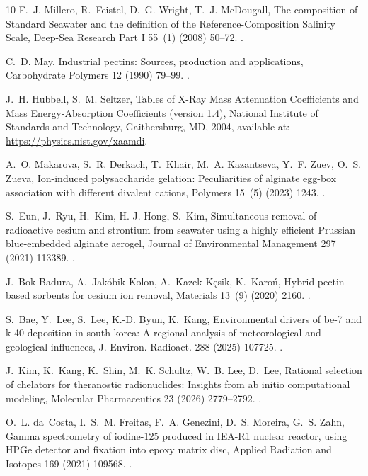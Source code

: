 \documentclass[preprint,12pt]{elsarticle}
\begin{document}
\begin{thebibliography}{10}
F.~J. Millero, R.~Feistel, D.~G. Wright, T.~J. McDougall, The composition of {Standard Seawater} and the definition of the {Reference-Composition Salinity Scale}, Deep-Sea Research Part I 55~(1) (2008) 50--72.
\newblock \href {https://doi.org/10.1016/j.dsr.2007.10.001} {}.

C.~D. May, Industrial pectins: Sources, production and applications, Carbohydrate Polymers 12 (1990) 79--99.
\newblock \href {https://doi.org/10.1016/0144-8617(90)90105-2} {}.

J.~H. Hubbell, S.~M. Seltzer, Tables of {X}-Ray Mass Attenuation Coefficients and Mass Energy-Absorption Coefficients (version 1.4), National Institute of Standards and Technology, Gaithersburg, MD, 2004, available at: \url{https://physics.nist.gov/xaamdi}.

A.~O. Makarova, S.~R. Derkach, T.~Khair, M.~A. Kazantseva, Y.~F. Zuev, O.~S. Zueva, Ion-induced polysaccharide gelation: Peculiarities of alginate egg-box association with different divalent cations, Polymers 15~(5) (2023) 1243.
\newblock \href {https://doi.org/10.3390/polym15051243} {}.

S.~Eun, J.~Ryu, H.~Kim, H.-J. Hong, S.~Kim, Simultaneous removal of radioactive cesium and strontium from seawater using a highly efficient {Prussian blue}-embedded alginate aerogel, Journal of Environmental Management 297 (2021) 113389.
\newblock \href {https://doi.org/10.1016/j.jenvman.2021.113389} {}.

J.~Bok-Badura, A.~Jak\'{o}bik-Kolon, A.~Kazek-K\k{e}sik, K.~Karo\'{n}, Hybrid pectin-based sorbents for cesium ion removal, Materials 13~(9) (2020) 2160.
\newblock \href {https://doi.org/10.3390/ma13092160} {}.

S.~Bae, Y.~Lee, S.~Lee, K.-D. Byun, K.~Kang, Environmental drivers of be-7 and k-40 deposition in south korea: A regional analysis of meteorological and geological influences, J. Environ. Radioact. 288 (2025) 107725.
\newblock \href {https://doi.org/10.1016/j.jenvrad.2025.107725} {}.

J.~Kim, K.~Kang, K.~Shin, M.~K. Schultz, W.~B. Lee, D.~Lee,
Rational selection of chelators for theranostic radionuclides:
Insights from ab initio computational modeling,
Molecular Pharmaceutics 23 (2026) 2779--2792.
\newblock \href {https://doi.org/10.1021/acs.molpharmaceut.5c01955}
{}.

O.~L. da~Costa, I.~S.~M. Freitas, F.~A. Genezini, D.~S. Moreira, G.~S. Zahn,
Gamma spectrometry of iodine-125 produced in {IEA-R1} nuclear reactor,
using {HPGe} detector and fixation into epoxy matrix disc,
Applied Radiation and Isotopes 169 (2021) 109568.
\newblock \href {https://doi.org/10.1016/j.apradiso.2020.109568} {}.

\end{thebibliography}
\end{document}
